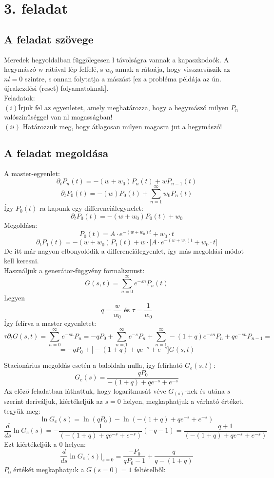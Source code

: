 \documentclass[12pt]{article}
\begin{document}
\newpage
\section*{3. feladat}
\subsection*{A feladat szövege}
Meredek hegyoldalban függőlegesen l távolságra vannak a kapaszkodoók. A hegymászó w rátával lép felfelé, s $w_0$ annak a rátaája, hogy visszacsűszik az $nl = 0$ szintre, s onnan folytatja a mászást [ez a probléma példája az ún. újrakezdési (reset) folyamatoknak].
\\Feladatok:\\
$(i)$Írjuk fel az egyenletet, amely meghatározza, hogy a hegymászó milyen $P_n$ valószínűséggel van nl magasságban!\\
$(ii)$ Határozzuk meg, hogy átlagosan milyen magasra jut a hegymászó!
\subsection*{A feladat megoldása}
A master-egyenlet:
$$ \partial_tP_n(t) = -(w+w_0)P_n(t) + wP_{n-1}(t) $$
$$\partial_tP_0(t ) = -(w)P_0(t) + \sum^\infty_{n = 1}w_0P_n(t)$$
Így $P_0(t)$-ra kapunk egy differenciálegynelet:
$$\partial_tP_0(t) = -(w+w_0)P_0(t) + w_0$$
Megoldása:
$$P_0(t) = A\cdot e^{-(w+w_0)t} + w_0\cdot t$$
$$\partial_t P_1(t) =-(w+w_0)P_{1}(t) +w\cdot \Big[A\cdot e^{-(w+w_0)t} + w_0\cdot t\Big ] $$
De itt már nagyon elbonyolódik a differenciálegyenlet, így más megoldási módot kell keresni. \\
Használjuk a generátor-függvény formalizmust:
$$G(s,t) = \sum^\infty_{n=0}e^{-sn}P_{n}(t)$$
Legyen 
$$q = \frac{w}{w_0}\text{ és }\tau = \frac{1}{w_0}$$
Így felírva a master egyenletet:
$$\tau\partial_t G(s, t) = \sum^\infty_{n=0}e^{-sn}P_n= -qP_0+\sum^\infty_{n=1}e^{-s}P_n+\sum^\infty_{n = 1}-(1+q)e^{-sn}P_n+ qe^{-sn}P_{n-1}=$$
$$=-qP_0 +\Big [-(1+q)+ qe^{-s}+ e^{-s}\Big ]G(s, t)$$





Stacionárius megoldás esetén a baloldala nulla, így felírható $G_e(s, t)$:
$$G_e(s) = \frac{qP_0}{-(1+q)+ qe^{-s}+ e^{-s}}$$
Az előző feladatban láthattuk, hogy logaritmusát véve $G_(s)$-nek és utána $s$ szerint deriváljuk, kiértékeljük az $s =0$ helyen,  megkaphatjuk a várható értéket.
tegyük meg:
$$\ln{G_e(s)} = \ln{(qP_0)}- \ln{(-(1+q)+ qe^{-s}+ e^{-s})}$$
$$\frac{d}{ds}\ln{G_e(s)}= -\frac{1}{(-(1+q)+ qe^{-s}+ e^{-s})}(-q-1)= \frac{q+1}{(-(1+q)+ qe^{-s}+ e^{-s})}$$
Ezt kiértékeljük a 0 helyen:
$$\frac{d}{ds}\ln{G_e(s)}\Big |_{s=0} = \frac{-P_0}{qP_0-1}+\frac{q}{q-(1+q)} $$
$P_0$ értékét megkaphatjuk a $G(s=0) =1$ feltételből:
\end{document}
